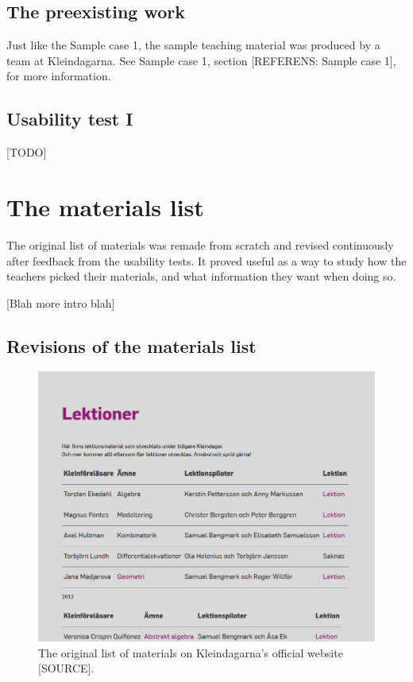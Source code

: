 \subsection{The preexisting work}

Just like the Sample case 1, the sample teaching material was produced by a team at Kleindagarna. See Sample case 1, section [REFERENS: Sample case 1], for more information.

\subsection{Usability test I}

[TODO]

\section{The materials list}

The original list of materials was remade from scratch and revised continuously after feedback from the usability tests. It proved useful as a way to study how the teachers picked their materials, and what information they want when doing so.

[Blah more intro blah]

\subsection{Revisions of the materials list}

\begin{figure}[H]
\centering
\includegraphics[width=\linewidth]{figure/screenshot_materiallista_kleindagarna.png}
\caption{The original list of materials on Kleindagarna's official website [SOURCE].}
\end{figure}

